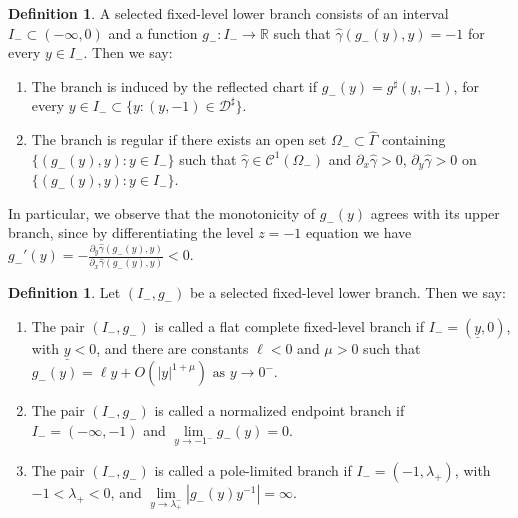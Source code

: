 \documentclass{amsart}
\theoremstyle{plain}
\theoremstyle{mainintrothm}
\theoremstyle{definition}
\newtheorem{definition}[theorem]{Definition}
\begin{document}
	\begin{definition}
		\label{def:selected-lower-branch}
		A selected fixed-level lower branch consists of an interval
		$I_-\subset(-\infty,0)$ and a function $g_-:I_-\to\mathbb R$ such that $\widehat\gamma(g_-(y),y)=-1$ for every $y\in I_-$. Then we say:
		\begin{enumerate}[label=\textup{(\roman*)}]
			\item The branch is induced by the reflected chart if
			$g_-(y)=g^\sharp(y,-1)$, for every $y\in I_-\subset\{y:(y,-1)\in\mathcal D^\sharp\}$.

			\item The branch is regular if there exists an open set
			$\Omega_-\subset\widehat\Gamma$ containing
			$\{(g_-(y),y):y\in I_-\}$ such that
			$\widehat\gamma\in\mathcal C^1(\Omega_-)$ and $\partial_x\widehat\gamma>0$, $\partial_y\widehat\gamma>0$ on $\{(g_-(y),y):y\in I_-\}$.
		\end{enumerate}

	\end{definition}

In particular, we observe that	the monotonicity of $g_-(y)$ agrees with its upper branch, since by differentiating the level $z=-1$ equation we have  $g_-'(y)=-\frac{\partial_y\widehat\gamma(g_-(y),y)}{\partial_x\widehat\gamma(g_-(y),y)}<0$.

	\begin{definition}
		\label{def:lower-continuation-outcomes}
		Let $(I_-,g_-)$ be a selected fixed-level lower branch. Then we say:
		\begin{enumerate}[label=\textup{(\roman*)}]
			\item The pair $(I_-,g_-)$ is called a flat complete fixed-level branch if
			$I_-=(\underline y,0)$, with $\underline y<0$, and there are constants
			$\ell<0$ and $\mu>0$ such that  $g_-(y)=\ell y+O(|y|^{1+\mu})\mbox{ as } y\to0^-$.

		
			\item The pair $(I_-,g_-)$ is called a normalized endpoint branch if
			$I_-=(-\infty,-1)$ and $\lim\limits_{y\to-1^-}g_-(y)=0$.

			\item The pair $(I_-,g_-)$ is called a pole-limited branch if
			$I_-=(-1,\lambda_+)$, with $-1<\lambda_+<0$, and $\lim\limits_{y\to\lambda_+^-}\left|g_-(y)y^{-1}\right|=\infty$.
		\end{enumerate}

	\end{definition}
\end{document}
